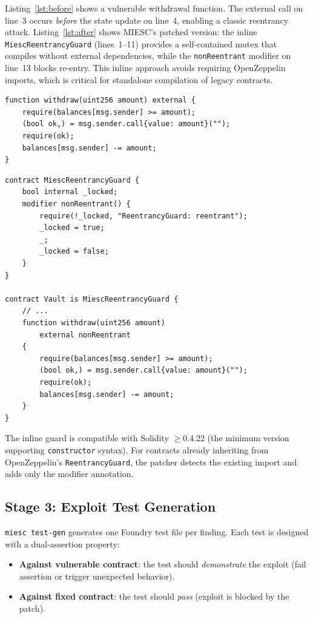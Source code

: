 \documentclass[conference]{IEEEtran}
\begin{document}
Listing~\ref{lst:before} shows a vulnerable withdrawal function. The external call on line~3 occurs \emph{before} the state update on line~4, enabling a classic reentrancy attack. Listing~\ref{lst:after} shows MIESC's patched version: the inline \texttt{MiescReentrancyGuard} (lines~1--11) provides a self-contained mutex that compiles without external dependencies, while the \texttt{nonReentrant} modifier on line~13 blocks re-entry. This inline approach avoids requiring OpenZeppelin imports, which is critical for standalone compilation of legacy contracts.

\begin{lstlisting}[caption={Vulnerable: external call before state update},label={lst:before},float=htbp]
function withdraw(uint256 amount) external {
    require(balances[msg.sender] >= amount);
    (bool ok,) = msg.sender.call{value: amount}("");
    require(ok);
    balances[msg.sender] -= amount;
}
\end{lstlisting}

\begin{lstlisting}[caption={Patched: inline reentrancy guard injected by MIESC},label={lst:after},float=htbp]
contract MiescReentrancyGuard {
    bool internal _locked;
    modifier nonReentrant() {
        require(!_locked, "ReentrancyGuard: reentrant");
        _locked = true;
        _;
        _locked = false;
    }
}

contract Vault is MiescReentrancyGuard {
    // ...
    function withdraw(uint256 amount)
        external nonReentrant
    {
        require(balances[msg.sender] >= amount);
        (bool ok,) = msg.sender.call{value: amount}("");
        require(ok);
        balances[msg.sender] -= amount;
    }
}
\end{lstlisting}

The inline guard is compatible with Solidity $\geq$0.4.22 (the minimum version supporting \texttt{constructor} syntax). For contracts already inheriting from OpenZeppelin's \texttt{ReentrancyGuard}, the patcher detects the existing import and adds only the modifier annotation.

\subsection{Stage 3: Exploit Test Generation}

\texttt{miesc test-gen} generates one Foundry test file per finding. Each test is designed with a dual-assertion property:

\begin{itemize}
    \item \textbf{Against vulnerable contract}: the test should \emph{demonstrate} the exploit (fail assertion or trigger unexpected behavior).
    \item \textbf{Against fixed contract}: the test should \emph{pass} (exploit is blocked by the patch).
\end{itemize}
\end{document}

